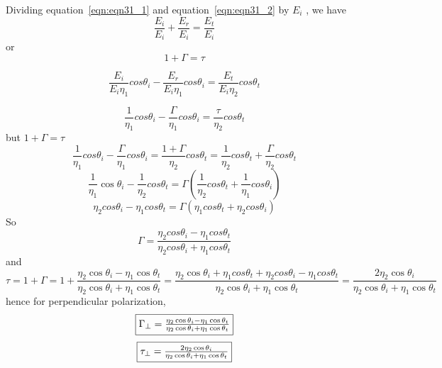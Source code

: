 Dividing equation~\ref{eqn:eqn31_1} and equation~\ref{eqn:eqn31_2} by $E_{i}$ , we have
\begin{equation*}
\frac{E_{i}}{E_{i}} + \frac{E_{r}}{E_{i}} = \frac{E_{t}}{E_{i}}
\end{equation*}
or
\begin{equation*}
1 + \Gamma = \tau
\end{equation*}

\begin{equation*}
\frac{E_{i}}{E_{i}\eta_{1}}cos\theta_{i} - \frac{E_{r}}{E_{i}\eta_{1}}cos\theta_{i} = \frac{E_{t}}{E_{i}\eta_{2}}cos\theta_{t}
\end{equation*}

\begin{equation*}
\frac{1}{\eta_{1}}cos\theta_{i} - \frac{\Gamma}{\eta_{1}}cos\theta_{i} = \frac{\tau}{\eta_{2}}cos\theta_{t}
\end{equation*}
but $1 + \Gamma = \tau$
\begin{dmath*}
\frac{1}{\eta_{1}}cos\theta_{i} - \frac{\Gamma}{\eta_{1}}cos\theta_{i} = \frac{1+\Gamma}{\eta_{2}}cos\theta_{t} = \frac{1}{\eta_{2}}cos\theta_{t} + \frac{\Gamma}{\eta_{2}}cos\theta_{t}
\end{dmath*}
\begin{equation*}
\frac{1}{\eta_{1}}\cos\theta_{i} - \frac{1}{\eta_{2}}cos\theta_{t} 	= \Gamma( \frac{1}{\eta_{2}}cos\theta_{t} + \frac{1}{\eta_{1}}cos\theta_{i})
\end{equation*}
$$\eta_{2}cos\theta_{i} - \eta_{1}cos\theta_{t} = \Gamma(\eta_{1}cos\theta_{t} + \eta_{2}cos\theta_{i})$$
So
$$\Gamma = \frac{\eta_{2}cos\theta_{i} - \eta_{1}cos\theta_{t}}{\eta_{2}cos\theta_{i} + \eta_{1}cos\theta_{t}}$$
and
\begin{dmath*}
\tau = 1 + \Gamma = 1 + \frac{\eta_{2}\cos\theta_{i} - \eta_{1}\cos\theta_{t}}{\eta_{2}\cos\theta_{i} + \eta_{1}\cos\theta_{t}}
= \frac{\eta_{2}\cos\theta_{i} + \eta_{1}cos\theta_{t} + \eta_{2}cos\theta_{i} - \eta_{1}cos\theta_{t}}{\eta_{2}\cos\theta_{i} + \eta_{1}\cos\theta_{t}} = \frac{2 \eta_{2}\cos\theta_{i}}{\eta_{2}\cos\theta_{i} + \eta_{1}\cos\theta_{t}}
\end{dmath*}
hence for perpendicular polarization,
\begin{dmath}
\fbox{$
\Gamma_{\perp} = \frac{\eta_{2}\cos\theta_{i} - \eta_{1}\cos\theta_{t}}{\eta_{2}\cos\theta_{i} + \eta_{1}\cos\theta_{t}}
$}
\label{eqn:eqn31_3}
\end{dmath}
\begin{dmath}
\fbox{$
\tau_{\perp} = \frac{2 \eta_{2}\cos\theta_{i}}{\eta_{2}\cos\theta_{i} + \eta_{1}\cos\theta_{t}}
$}
\label{eqn:eqn31_4}
\end{dmath}


